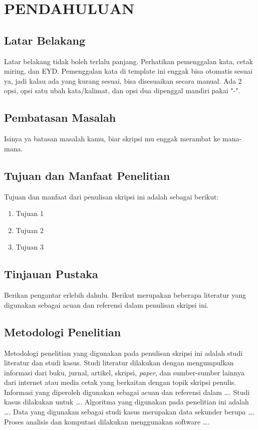 \setcounter{page}{1}
\chapter{PENDAHULUAN}

\section{Latar Belakang}
Latar belakang tidak boleh terlalu panjang. Perhatikan pemenggalan kata, cetak miring, dan EYD. Pemenggalan kata di template ini enggak bisa otomatis sesuai ya, jadi kalau ada yang kurang sesuai, bisa disesuaikan secara manual. Ada 2 opsi, opsi satu ubah kata/kalimat, dan opsi dua dipenggal mandiri pakai "-".

\section{Pembatasan Masalah}
Isinya ya batasan masalah kamu, biar skripsi mu enggak merambat ke mana-mana.

\section{Tujuan dan Manfaat Penelitian}
Tujuan dan manfaat dari penulisan skripsi ini adalah sebagai berikut:
\begin{enumerate}
    \item Tujuan 1
    \item Tujuan 2
    \item Tujuan 3
\end{enumerate}

\section{Tinjauan Pustaka}
Berikan pengantar erlebih dahulu. Berikut merupakan beberapa literatur yang digunakan sebagai acuan dan referensi dalam penulisan skripsi ini. 


\section{Metodologi Penelitian}
Metodologi penelitian yang digunakan pada penulisan skripsi ini adalah studi literatur dan studi kasus. Studi literatur dilakukan dengan mengumpulkan informasi dari buku, jurnal, artikel, skripsi, \textit{paper}, dan sumber-sumber lainnya dari internet atau media cetak yang berkaitan dengan topik skripsi penulis. Informasi yang diperoleh digunakan sebagai acuan dan referensi dalam \ldots. Studi kasus dilakukan untuk \ldots. Algoritma yang digunakan pada penelitian ini adalah \ldots. Data yang digunakan sebagai studi kasus merupakan data sekunder berupa \ldots. Proses analisis dan komputasi dilakukan menggunakan software \ldots. 

